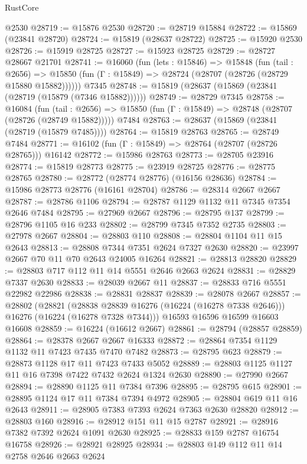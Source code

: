 \begin{lexlean}{RustCore}
\begin{coremodule}
    @2530
@28719 := @15876 @2530
@28720 := @28719 @15884
@28722 := @15869 (@23841 @28720)
@28724 := @15819 (@28637 @28722)
@28725 := @15920 @2530
@28726 := @15919 @28725
@28727 := @15923 @28725
@28729 := @28727 @28667 @21701
@28741 := @16060
    (fun (lets : @15846) =>
    @15848
      (fun (tail : @2656) =>
      @15850 (fun (Γ : @15849) => @28724 (@28707 (@28726 (@28729 @15880 @15882))))))
    @7345
@28748 := @15819 (@28637 (@15869 (@23841 (@28719 (@15879 (@7346 @15882))))))
@28749 := @28729 @7345
@28758 := @16084
    (fun (tail : @2656) => @15850 (fun (Γ : @15849) => @28748 (@28707 (@28726 (@28749 @15882)))))
    @7484
@28763 := @28637 (@15869 (@23841 (@28719 (@15879 @7485))))
@28764 := @15819 @28763
@28765 := @28749 @7484
@28771 := @16102 (fun (Γ : @15849) => @28764 (@28707 (@28726 @28765))) @16142
@28772 := @15986 @28763
@28773 := @28705 @23916
@28774 := @15819 @28773
@28775 := @23919 @28725
@28776 := @28775 @28765
@28780 := @28772 (@28774 @28776) (@16156 @28636)
@28784 := @15986 @28773 @28776 (@16161 @28704)
@28786 := @28314 @2667 @2667
@28787 := @28786 @1106
@28794 := @28787 @1129 @1132 @11 @7345 @7354 @2646 @7484
@28795 := @27969 @2667
@28796 := @28795 @137
@28799 := @28796 @1105 @16 @233
@28802 := @28799 @7345 @7352 @2735
@28803 := @27978 @2667
@28804 := @28803 @110
@28808 := @28804 @1104 @11 @15 @2643
@28813 := @28808 @7344 @7351 @2624 @7327 @2630
@28820 := @23997 @2667 @70 @11 @70 @2643 @24005 @16264
@28821 := @28813 @28820
@28829 := @28803 @717 @112 @11 @14 @5551 @2646 @2663 @2624
@28831 := @28829 @7337 @2630
@28833 := @28039 @2667 @11
@28837 := @28833 @716 @5551 @22982 @22986
@28838 := @28831 @28837
@28839 := @28078 @2667
@28857 := @28802
    (@28821
      (@28838 @28839 @16276 (@16224 (@16278 @7338 @2646)))
      @16276
      (@16224 (@16278 @7328 @7344)))
    @16593
    @16596
    @16599
    @16603
    @16608
@28859 := @16224 (@16612 @2667)
@28861 := @28794 (@28857 @28859)
@28864 := @28378 @2667 @2667 @16333
@28872 := @28864 @7354 @1129 @1132 @11 @7423 @7435 @7470 @7482
@28873 := @28795 @623
@28879 := @28873 @1128 @17 @11 @7423 @7433 @5052
@28889 := @28803 @1125 @1127 @11 @16 @7398 @7422 @7432 @2624 @1324 @2630
@28890 := @27990 @2667
@28894 := @28890 @1125 @11 @7384 @7396
@28895 := @28795 @615
@28901 := @28895 @1124 @17 @11 @7384 @7394 @4972
@28905 := @28804 @619 @11 @16 @2643
@28911 := @28905 @7383 @7393 @2624 @7363 @2630 @28820
@28912 := @28803 @160
@28916 := @28912 @151 @11 @15 @2787
@28921 := @28916 @7382 @7392 @2624 @1091 @2630
@28925 := @28833 @159 @2787 @16754 @16758
@28926 := @28921 @28925
@28934 := @28803 @149 @112 @11 @14 @2758 @2646 @2663 @2624

\end{coremodule}
\end{lexlean}

